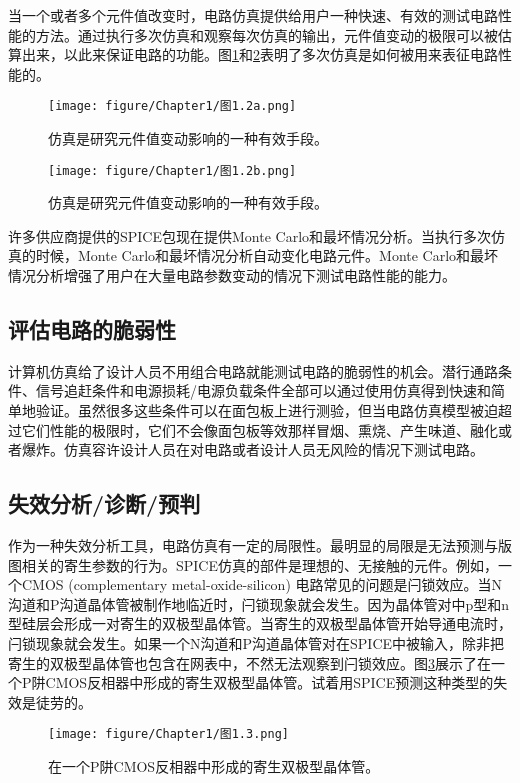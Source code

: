 当一个或者多个元件值改变时，电路仿真提供给用户一种快速、有效的测试电路性能的方法。通过执行多次仿真和观察每次仿真的输出，元件值变动的极限可以被估算出来，以此来保证电路的功能。图\ref{图1.2(a)}和\ref{图1.2(b)}表明了多次仿真是如何被用来表征电路性能的。
\begin{figure}[htbp]
\small
    \centering
    \texttt{[image: figure/Chapter1/图1.2a.png]}
    \caption{仿真是研究元件值变动影响的一种有效手段。}
    \label{图1.2(a)}
\end{figure}
\begin{figure}[htbp]
\small
    \centering
    \texttt{[image: figure/Chapter1/图1.2b.png]}
    \caption{仿真是研究元件值变动影响的一种有效手段。}
    \label{图1.2(b)}
\end{figure}

许多供应商提供的SPICE包现在提供Monte Carlo和最坏情况分析。当执行多次仿真的时候，Monte Carlo和最坏情况分析自动变化电路元件。Monte Carlo和最坏情况分析增强了用户在大量电路参数变动的情况下测试电路性能的能力。

\subsection{评估电路的脆弱性}
计算机仿真给了设计人员不用组合电路就能测试电路的脆弱性的机会。潜行通路条件、信号追赶条件和电源损耗/电源负载条件全部可以通过使用仿真得到快速和简单地验证。虽然很多这些条件可以在面包板上进行测验，但当电路仿真模型被迫超过它们性能的极限时，它们不会像面包板等效那样冒烟、熏烧、产生味道、融化或者爆炸。仿真容许设计人员在对电路或者设计人员无风险的情况下测试电路。

\subsection{失效分析/诊断/预判}
作为一种失效分析工具，电路仿真有一定的局限性。最明显的局限是无法预测与版图相关的寄生参数的行为。SPICE仿真的部件是理想的、无接触的元件。例如，一个CMOS (complementary metal-oxide-silicon) 电路常见的问题是闩锁效应。当N沟道和P沟道晶体管被制作地临近时，闩锁现象就会发生。因为晶体管对中p型和n型硅层会形成一对寄生的双极型晶体管。当寄生的双极型晶体管开始导通电流时，闩锁现象就会发生。如果一个N沟道和P沟道晶体管对在SPICE中被输入，除非把寄生的双极型晶体管也包含在网表中，不然无法观察到闩锁效应。图\ref{图1.3}展示了在一个P阱CMOS反相器中形成的寄生双极型晶体管。试着用SPICE预测这种类型的失效是徒劳的。
\begin{figure}[htbp]
\small
    \centering
    \texttt{[image: figure/Chapter1/图1.3.png]}
    \caption{在一个P阱CMOS反相器中形成的寄生双极型晶体管。}
    \label{图1.3}
\end{figure}


